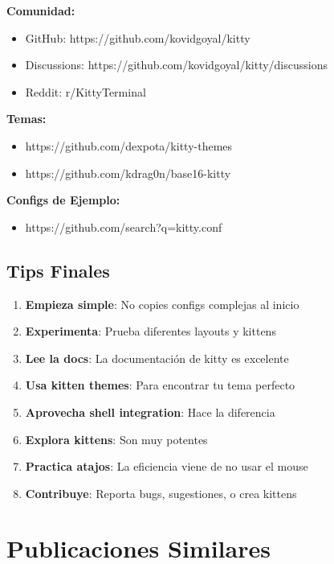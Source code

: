 \documentclass[
  doc,
  floatsintext,
  longtable,
  a4paper,
  nolmodern,
  notxfonts,
  notimes,
  12pt,
  colorlinks=true,linkcolor=blue,citecolor=blue,urlcolor=blue]{apa7}
\providecommand{\tightlist}{%
  \setlength{\itemsep}{0pt}\setlength{\parskip}{0pt}}
\begin{document}
\textbf{Comunidad:}

\begin{itemize}
\tightlist
\item
  GitHub: https://github.com/kovidgoyal/kitty
\item
  Discussions: https://github.com/kovidgoyal/kitty/discussions
\item
  Reddit: r/KittyTerminal
\end{itemize}

\textbf{Temas:}

\begin{itemize}
\tightlist
\item
  https://github.com/dexpota/kitty-themes
\item
  https://github.com/kdrag0n/base16-kitty
\end{itemize}

\textbf{Configs de Ejemplo:}

\begin{itemize}
\tightlist
\item
  https://github.com/search?q=kitty.conf
\end{itemize}

\subsection{Tips Finales}\label{tips-finales}

\begin{enumerate}
\def\labelenumi{\arabic{enumi}.}
\tightlist
\item
  \textbf{Empieza simple}: No copies configs complejas al inicio
\item
  \textbf{Experimenta}: Prueba diferentes layouts y kittens
\item
  \textbf{Lee la docs}: La documentación de kitty es excelente
\item
  \textbf{Usa kitten themes}: Para encontrar tu tema perfecto
\item
  \textbf{Aprovecha shell integration}: Hace la diferencia
\item
  \textbf{Explora kittens}: Son muy potentes
\item
  \textbf{Practica atajos}: La eficiencia viene de no usar el mouse
\item
  \textbf{Contribuye}: Reporta bugs, sugestiones, o crea kittens
\end{enumerate}

\section{Publicaciones Similares}\label{publicaciones-similares}
\end{document}
